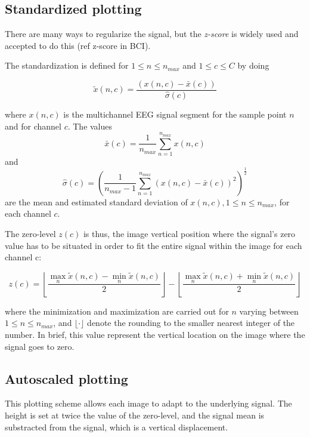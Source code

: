 \subsection{Standardized plotting}

There are many ways to regularize the signal, but the \textit{z-score} is widely used and accepted to do this (ref z-score in BCI).

The standardization is defined for  $1 \leq n \leq n_{max}$ and $1 \leq c \leq C$ by doing

\begin{equation}
\tilde{x}(n,c) =  \frac{( x(n,c) - \bar{x}(c)  )}{ \hat{\sigma}(c) } 
\label{eq:standarizedaverages}
\end{equation}

\noindent  where $ x(n,c) $ is the multichannel EEG signal segment for the sample point $n$ and for channel $c$. The values $$\bar{x}(c) =\frac{1}{n_{max}}\sum_{n=1}^{n_{max}}x(n,c)$$ and $$ \hat{\sigma}(c) = (\frac{1}{n_{max}-1}\sum_{n=1}^{n_{max}}(x(n,c)-\bar{x}(c))^2 )^{\frac{1}{2}}$$ are the mean and estimated standard deviation of $x(n,c), 1 \leq n \leq n_{max}$, for each channel $c$.

The zero-level $z(c)$ is thus, the image vertical position where the signal's zero value has to be situated in order to fit the entire signal within the image for each channel c:

\begin{equation}
z(c) = \left \lfloor{ \frac{\max_{n} \tilde{x}(n,c)  - \min_{n} \tilde{x}(n,c) }{2} }\right \rfloor -   \left \lfloor{ \frac{\max_{n} \tilde{x}(n,c)  + \min_{n} \tilde{x}(n,c)}{ 2} }\right \rfloor
\label{eq:zerolevel}
\end{equation}

\noindent where the minimization and maximization are carried out for $n$ varying between ${1 \leq n\leq n_{max}}$, and $ \lfloor \cdot  \rfloor $ denote the rounding to the smaller nearest integer of the number.  In brief, this value represent the vertical location on the image where the signal goes to zero.


\subsection{Autoscaled plotting}

This plotting scheme allows each image to adapt to the underlying signal.  The height is set at twice the value of the zero-level, and the signal mean is substracted from the signal, which is a vertical displacement.

